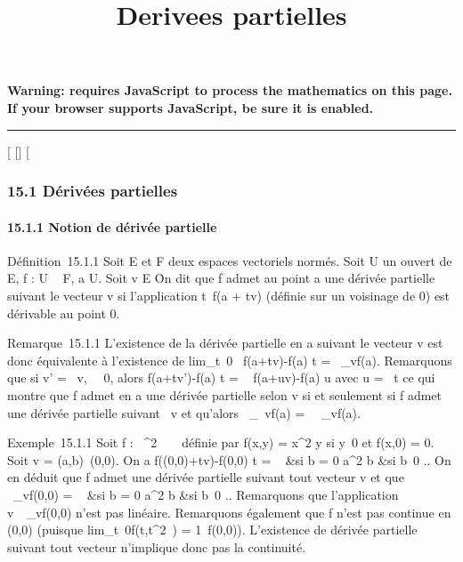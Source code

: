 \documentclass[]{article}
\title{Derivees partielles}
\author{}
\date{}
\begin{document}
\maketitle

\textbf{Warning: 
requires JavaScript to process the mathematics on this page.\\ If your
browser supports JavaScript, be sure it is enabled.}

\begin{center}\rule{3in}{0.4pt}\end{center}

{[}
{[}{]}
{[}

\subsubsection{15.1 Dérivées partielles}

\paragraph{15.1.1 Notion de dérivée partielle}

Définition~15.1.1 Soit E et F deux espaces vectoriels normés. Soit U un
ouvert de E, f : U \rightarrow~ F, a \in U. Soit v \in E
\diagdown\0\. On dit que f admet au point a
une dérivée partielle suivant le vecteur v si l'application
t\mapsto~f(a + tv) (définie sur un voisinage de 0)
est dérivable au point 0.

Remarque~15.1.1 L'existence de la dérivée partielle en a suivant le
vecteur v est donc équivalente à l'existence de
lim\_t\rightarrow~0~ f(a+tv)-f(a)
\over t = \partial~\_vf(a). Remarquons que si v' = \lambda~v,
\lambda~\neq~0, alors  f(a+tv')-f(a)
\over t = \lambda~ f(a+uv)-f(a) \over u
avec u = \lambda~t ce qui montre que f admet en a une dérivée partielle selon v
si et seulement si f admet une dérivée partielle suivant \lambda~v et qu'alors
\partial~\_\lambda~vf(a) = \lambda~\partial~\_vf(a).

Exemple~15.1.1 Soit f : ~^2 \rightarrow~ ~ définie par f(x,y) =
x^2 \over y si
y\neq~0 et f(x,0) = 0. Soit v =
(a,b)\neq~(0,0). On a  f((0,0)+tv)-f(0,0)
\over t = \left \
 &si b = 0 \cr 
a^2 \over b &si
b\neq~0  \right .. On en déduit
que f admet une dérivée partielle suivant tout vecteur v et que
\partial~\_vf(0,0) = \left \
 &si b = 0 \cr 
a^2 \over b &si
b\neq~0  \right .. Remarquons
que l'application v\mapsto~\partial~\_vf(0,0) n'est
pas linéaire. Remarquons également que f n'est pas continue en (0,0)
(puisque lim\_t\rightarrow~0f(t,t^2~) =
1\neq~f(0,0)). L'existence de dérivée partielle
suivant tout vecteur n'implique donc pas la continuité.
\end{document}
